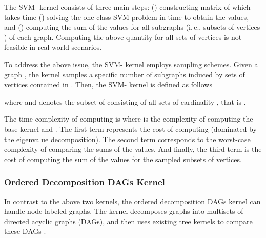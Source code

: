 \documentclass[twoside,11pt]{article}
\newcommand{\ie}{i.\,e., }
\begin{document}
The SVM- kernel consists of three main steps: () constructing matrix  of  which takes  time () solving the one-class SVM problem in  time to obtain the  values, and () computing the sum of the  values for all subgraphs (\ie subsets of vertices ) of each graph.
Computing the above quantity for all  sets of vertices is not feasible in real-world scenarios.

To address the above issue, the SVM- kernel employs sampling schemes.
Given a graph , the kernel samples a specific number of subgraphs induced by sets of vertices contained in .
Then, the SVM- kernel is defined as follows

where  and  denotes the subset of  consisting of all sets of cardinality , that is .

The time complexity of computing  is  where  is the complexity of computing the base kernel  and .
The first term represents the cost of computing  (dominated by the eigenvalue decomposition).
The second term corresponds to the worst-case complexity of comparing the sums of the  values.
And finally, the third term is the cost of computing the sum of the  values for the sampled subsets of vertices.

\subsubsection{Ordered Decomposition DAGs Kernel}
In contrast to the above two kernels, the ordered decomposition DAGs kernel can handle node-labeled graphs.
The kernel decomposes graphs into multisets of directed acyclic graphs (DAGs), and then uses existing tree kernels to compare these DAGs .
\end{document}
